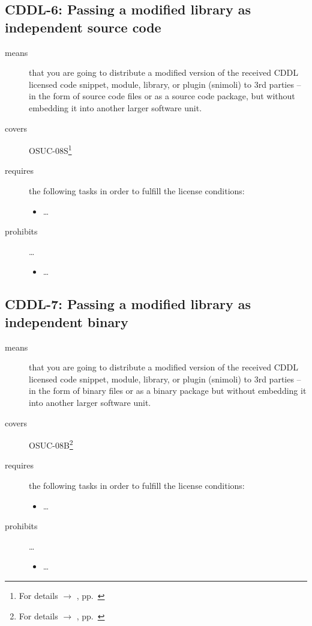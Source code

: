 \subsection{CDDL-6: Passing a modified library as independent source code}
\label{OSUC-08S-CDDL}

\begin{description}
\item[means] that you are going to distribute a modified version of the received
CDDL licensed code snippet, module, library, or plugin (snimoli) to 3rd parties
-- in the form of source code files or as a source code package, but without
embedding it into another larger software unit.
\item[covers] OSUC-08S\footnote{For details $\rightarrow$ \oslic, pp.\
\pageref{OSUC-08S-DEF}}
\item[requires] the following tasks in order to fulfill the license conditions:
\begin{itemize}
  
  \item \ldots
  
\end{itemize}

\item[prohibits] \ldots
\begin{itemize}
  \item \ldots
\end{itemize}
\end{description}

\subsection{CDDL-7: Passing a modified library as independent binary}
\label{OSUC-08B-CDDL}

\begin{description}
\item[means] that you are going to distribute a modified version of the received
CDDL licensed code snippet, module, library, or plugin (snimoli) to 3rd parties
-- in the form of binary files or as a binary package but without embedding it
into another larger software unit.
\item[covers] OSUC-08B\footnote{For details $\rightarrow$ \oslic, pp.\
\pageref{OSUC-08B-DEF}}
\item[requires] the following tasks in order to fulfill the license conditions:
\begin{itemize}
  
  \item \ldots
  
\end{itemize}

\item[prohibits] \ldots
\begin{itemize}
  \item \ldots
\end{itemize}
\end{description}

